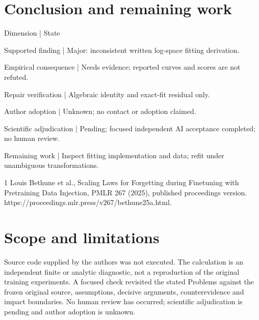\documentclass[10pt]{article}
\begin{document}
\section*{Conclusion and remaining work}
Dimension | State\par
Supported finding | Major: inconsistent written log-space fitting derivation.\par
Empirical consequence | Needs evidence; reported curves and scores are not refuted.\par
Repair verification | Algebraic identity and exact-fit residual only.\par
Author adoption | Unknown; no contact or adoption claimed.\par
Scientific adjudication | Pending; focused independent AI acceptance completed; no human review.\par
Remaining work | Inspect fitting implementation and data; refit under unambiguous transformations.\par
1 Louis Bethune et al., Scaling Laws for Forgetting during Finetuning with Pretraining Data Injection, PMLR 267 (2025), published proceedings version. https://proceedings.mlr.press/v267/bethune25a.html.\par
\section*{Scope and limitations}
Source code supplied by the authors was not executed. The calculation is an independent finite or analytic diagnostic, not a reproduction of the original training experiments. A focused check revisited the stated Problems against the frozen original source, assumptions, decisive arguments, counterevidence and impact boundaries. No human review has occurred; scientific adjudication is pending and author adoption is unknown.\par
\end{document}
